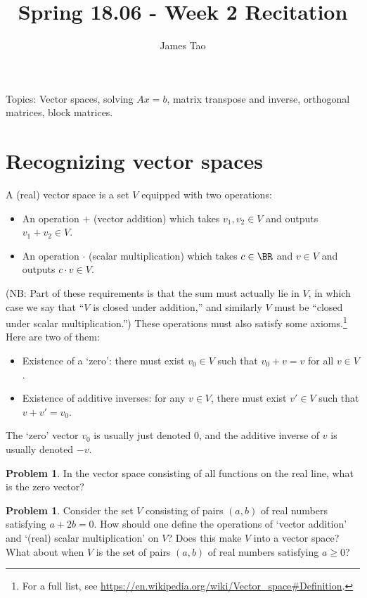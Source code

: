 \documentclass[10pt]{amsart}
\title{Spring 18.06 - Week 2 Recitation}
\author{James Tao}
\theoremstyle{mythm}
\theoremstyle{definition}
\newtheorem{prob}[thm]{Problem}
\theoremstyle{myrmk}
\begin{document}
	\thispagestyle{fancy}
	\noindent Topics: Vector spaces, solving $Ax=b$, matrix transpose and inverse, orthogonal matrices, block matrices. 
	
	\section{Recognizing vector spaces} 
	
	A (real) vector space is a set $V$ equipped with two operations: 
	\begin{itemize}
		\item An operation $+$ (vector addition) which takes $v_1, v_2 \in V$ and outputs $v_1 + v_2 \in V$. 
		\item An operation $\cdot$ (scalar multiplication) which takes $c \in \BR$ and $v \in V$ and outputs $c \cdot v \in V$. 
	\end{itemize}
	(NB: Part of these requirements is that the sum must actually lie in $V$, in which case we say that ``$V$ is closed under addition,'' and similarly $V$ must be ``closed under scalar multiplication.'') These operations must also satisfy some axioms.\footnote{For a full list, see \url{https://en.wikipedia.org/wiki/Vector_space\#Definition}.} Here are two of them: 
	\begin{itemize}
		\item Existence of a `zero': there must exist $v_0 \in V$ such that $v_0 + v = v$ for all $v \in V$. 
		\item Existence of additive inverses: for any $v \in V$, there must exist $v' \in V$ such that $v+v' = v_0$. 
	\end{itemize}
	The `zero' vector $v_0$ is usually just denoted $0$, and the additive inverse of $v$ is usually denoted $-v$. 
	\begin{prob}
		In the vector space consisting of all functions on the real line, what is the zero vector? 
	\end{prob}
	\begin{prob}
		Consider the set $V$ consisting of pairs $(a, b)$ of real numbers satisfying $a + 2b = 0$. How should one define the operations of  `vector addition' and `(real) scalar multiplication' on $V$? Does this make $V$ into a vector space? What about when $V$ is the set of pairs $(a, b)$ of real numbers satisfying $a \ge 0$? 
	\end{prob}
	
\end{document}
